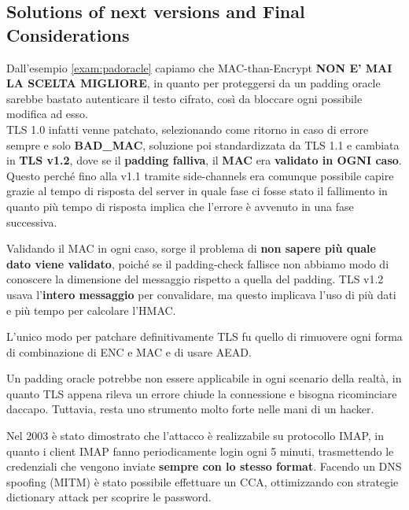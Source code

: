 \subsection{Solutions of next versions and Final Considerations}Dall'esempio \ref{exam:padoracle} capiamo che MAC-than-Encrypt \textbf{NON E' MAI LA SCELTA MIGLIORE}, in quanto per proteggersi da un padding oracle sarebbe bastato autenticare il testo cifrato, così da bloccare ogni possibile modifica ad esso.\\
TLS 1.0 infatti venne patchato, selezionando come ritorno in caso di errore sempre e solo \textbf{BAD\_MAC}, soluzione poi standardizzata da TLS 1.1 e cambiata in \textbf{TLS v1.2}, dove se il \textbf{padding falliva}, il \textbf{MAC} era \textbf{validato in OGNI caso}.
Questo perché fino alla v1.1 tramite side-channels era comunque possibile capire grazie al tempo di risposta del server in quale fase ci fosse stato il fallimento in quanto più tempo di risposta implica che l'errore è avvenuto in una fase successiva.\\
\begin{corollary}
Validando il MAC in ogni caso, sorge il problema di \textbf{non sapere più quale dato viene validato}, poiché se il padding-check fallisce non abbiamo modo di conoscere la dimensione del messaggio rispetto a quella del padding. TLS v1.2 usava l'\textbf{intero messaggio} per convalidare, ma questo implicava l'uso di più dati e più tempo per calcolare l'HMAC.
\end{corollary}
\begin{remark}
L'unico modo per patchare definitivamente TLS fu quello di rimuovere ogni forma di combinazione di ENC e MAC e di usare AEAD.
\end{remark}
\begin{proposition}
Un padding oracle potrebbe non essere applicabile in ogni scenario della realtà, in quanto TLS appena rileva un errore chiude la connessione e bisogna ricominciare daccapo. Tuttavia, resta uno strumento molto forte nelle mani di un hacker.
\end{proposition}
Nel 2003 è stato dimostrato che l'attacco è realizzabile su protocollo IMAP, in quanto i client IMAP fanno periodicamente login ogni 5 minuti, trasmettendo le credenziali che vengono inviate \textbf{sempre con lo stesso format}. Facendo un DNS spoofing (MITM) è stato possibile effettuare un CCA, ottimizzando con strategie dictionary attack per scoprire le password.

